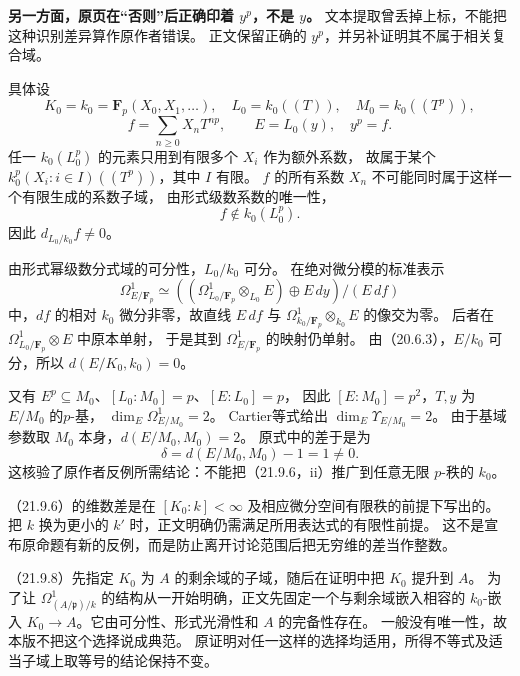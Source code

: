 \textbf{另一方面，原页在“否则”后正确印着 $y^p$，不是 $y$。}
文本提取曾丢掉上标，不能把这种识别差异算作原作者错误。
正文保留正确的 $y^p$，并另补证明其不属于相关复合域。

具体设
\[
 K_0=k_0=\mathbf F_p(X_0,X_1,\ldots),\quad
 L_0=k_0((T)),\quad M_0=k_0((T^p)),
\]
\[
 f=\sum_{n\ge0}X_nT^{np},\qquad E=L_0(y),\quad y^p=f.
\]
任一 $k_0(L_0^p)$ 的元素只用到有限多个 $X_i$ 作为额外系数，
故属于某个
$k_0^p(X_i:i\in I)((T^p))$，其中 $I$ 有限。
$f$ 的所有系数 $X_n$ 不可能同时属于这样一个有限生成的系数子域，
由形式级数系数的唯一性，
\[
 f\notin k_0(L_0^p).
\]
因此 $d_{L_0/k_0}f\ne0$。

由形式幂级数分式域的可分性，$L_0/k_0$ 可分。
在绝对微分模的标准表示
\[
 \Omega^1_{E/\mathbf F_p}
 \simeq
 \left((\Omega^1_{L_0/\mathbf F_p}\otimes_{L_0}E)\oplus E\,dy\right)/(E\,df)
\]
中，$df$ 的相对 $k_0$ 微分非零，故直线 $E\,df$ 与
$\Omega^1_{k_0/\mathbf F_p}\otimes_{k_0}E$ 的像交为零。
后者在 $\Omega^1_{L_0/\mathbf F_p}\otimes E$ 中原本单射，
于是其到 $\Omega^1_{E/\mathbf F_p}$ 的映射仍单射。
由（20.6.3），$E/k_0$ 可分，所以 $d(E/K_0,k_0)=0$。

又有 $E^p\subseteq M_0$、$[L_0:M_0]=p$、$[E:L_0]=p$，
因此 $[E:M_0]=p^2$，$T,y$ 为 $E/M_0$ 的$p$-基，
$\dim_E\Omega^1_{E/M_0}=2$。
Cartier等式给出 $\dim_E\Upsilon_{E/M_0}=2$。
由于基域参数取 $M_0$ 本身，$d(E/M_0,M_0)=2$。
原式中的差于是为
\[
 \delta=d(E/M_0,M_0)-1=1\ne0.
\]
这核验了原作者反例所需结论：不能把（21.9.6，ii）推广到任意无限 $p$-秩的 $k_0$。

（21.9.6）的维数差是在 $[K_0:k]<\infty$ 及相应微分空间有限秩的前提下写出的。
把 $k$ 换为更小的 $k'$ 时，正文明确仍需满足所用表达式的有限性前提。
这不是宣布原命题有新的反例，而是防止离开讨论范围后把无穷维的差当作整数。

（21.9.8）先指定 $K_0$ 为 $A$ 的剩余域的子域，随后在证明中把 $K_0$ 提升到 $A$。
为了让 $\Omega^1_{(A/\mathfrak p)/k}$ 的结构从一开始明确，正文先固定一个与剩余域嵌入相容的
$k_0$-嵌入 $K_0\to A$。它由可分性、形式光滑性和 $A$ 的完备性存在。
一般没有唯一性，故本版不把这个选择说成典范。
原证明对任一这样的选择均适用，所得不等式及适当子域上取等号的结论保持不变。

